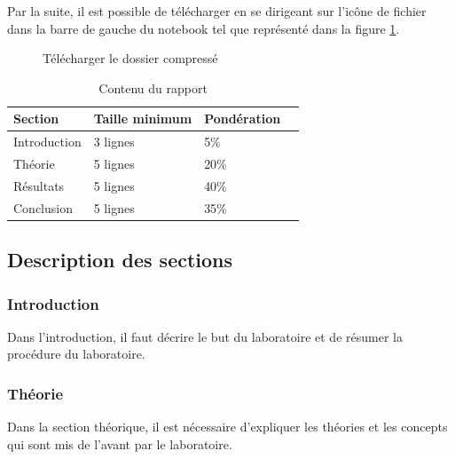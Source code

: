 \documentclass{article}
\begin{document}
\medbreak
Par la suite, il est possible de télécharger en se dirigeant sur l'icône de fichier dans la barre de gauche du notebook tel que représenté dans la figure \ref{fig:downloadzip}.
\begin{figure}[H]
  \centering
  \caption{Télécharger le dossier compressé}
  \label{fig:downloadzip}
\end{figure}

\begin{table}[H]
  \caption{Contenu du rapport}
  \label{tab:remettre}
  \centering
  \begin{tabular}{|l|l|l|c|}
    \hline
    Section & Taille minimum & Pondération \\
    \hline
    Introduction & 3 lignes & 5\%\\
    Théorie & 5 lignes & 20\%\\
    Résultats & 5 lignes & 40\%\\
    Conclusion & 5 lignes & 35\%\\
    \hline
  \end{tabular}
\end{table}

\subsection{Description des sections}
\subsubsection{Introduction}
Dans l'introduction, il faut décrire le but du laboratoire et de résumer la procédure du laboratoire.

\subsubsection{Théorie}
Dans la section théorique, il est nécessaire d'expliquer les théories et les concepts qui sont mis de l'avant par le laboratoire.
\end{document}
